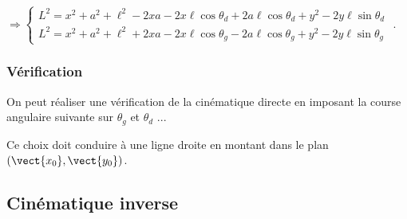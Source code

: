 \documentclass[10pt,fleqn]{article} %
\begin{document}
$
\Rightarrow
\left\{
\begin{array}{l}
L^2 = x^2  +a^2+\ell^2  -2xa -2x\ell\cos\theta_d+2a\ell\cos\theta_d  +  y^2 - 2y \ell   \sin\theta_d  \\
L^2 = x^2  +a^2+\ell^2 +2xa -2x\ell\cos\theta_g-2a\ell\cos\theta_g  +  y^2  -2y  \ell   \sin\theta_g 
\end{array}
\right.
$ .

\subsubsection{Vérification}
On peut réaliser une vérification de la cinématique directe en imposant la course angulaire suivante sur $\theta_g$ et $\theta_d$ ...

Ce choix doit conduire à une ligne droite en montant dans le plan $\left(\vect{x_0},\vect{y_0}\right)$.

\subsection{Cinématique inverse}
\end{document}
